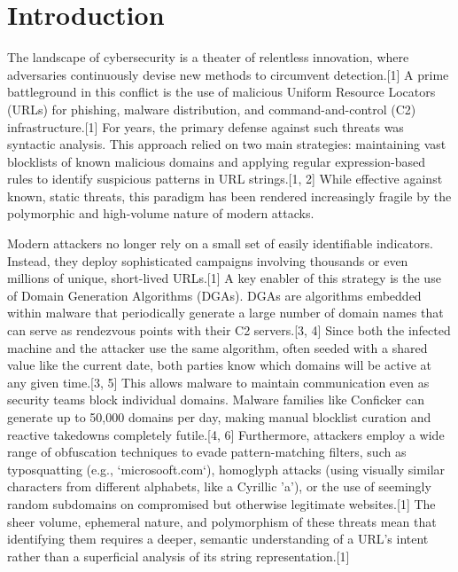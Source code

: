 \documentclass[journal,article,submit,pdftex,moreauthors]{Definitions/mdpi}
\begin{document}
\section{Introduction}
The landscape of cybersecurity is a theater of relentless innovation, where adversaries continuously devise new methods to circumvent detection.[1] A prime battleground in this conflict is the use of malicious Uniform Resource Locators (URLs) for phishing, malware distribution, and command-and-control (C2) infrastructure.[1] For years, the primary defense against such threats was syntactic analysis. This approach relied on two main strategies: maintaining vast blocklists of known malicious domains and applying regular expression-based rules to identify suspicious patterns in URL strings.[1, 2] While effective against known, static threats, this paradigm has been rendered increasingly fragile by the polymorphic and high-volume nature of modern attacks.

Modern attackers no longer rely on a small set of easily identifiable indicators. Instead, they deploy sophisticated campaigns involving thousands or even millions of unique, short-lived URLs.[1] A key enabler of this strategy is the use of Domain Generation Algorithms (DGAs). DGAs are algorithms embedded within malware that periodically generate a large number of domain names that can serve as rendezvous points with their C2 servers.[3, 4] Since both the infected machine and the attacker use the same algorithm, often seeded with a shared value like the current date, both parties know which domains will be active at any given time.[3, 5] This allows malware to maintain communication even as security teams block individual domains. Malware families like Conficker can generate up to 50,000 domains per day, making manual blocklist curation and reactive takedowns completely futile.[4, 6] Furthermore, attackers employ a wide range of obfuscation techniques to evade pattern-matching filters, such as typosquatting (e.g., `microsooft.com`), homoglyph attacks (using visually similar characters from different alphabets, like a Cyrillic 'a'), or the use of seemingly random subdomains on compromised but otherwise legitimate websites.[1] The sheer volume, ephemeral nature, and polymorphism of these threats mean that identifying them requires a deeper, semantic understanding of a URL's intent rather than a superficial analysis of its string representation.[1]
\end{document}
